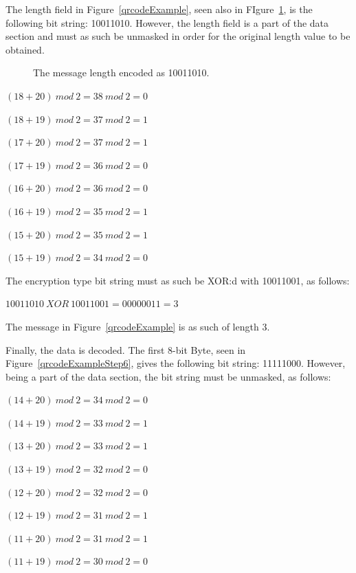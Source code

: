 The length field in Figure~\ref{qrcodeExample}, seen also in FIgure~\ref{qrcodeExampleStep5}, is the following bit string: 10011010. However, the length field is a part of the data section and must as such be unmasked in order for the original length value to be obtained.

	\begin{figure}[H]%
		\centering
		\caption{The message length encoded as 10011010.}
		\label{qrcodeExampleStep5}
	\end{figure}

\begin{center}

\((18+20)~mod~2=38~mod~2=0\)

\((18+19)~mod~2=37~mod~2=1\)

\((17+20)~mod~2=37~mod~2=1\)

\((17+19)~mod~2=36~mod~2=0\)

\((16+20)~mod~2=36~mod~2=0\) 

\((16+19)~mod~2=35~mod~2=1\)

\((15+20)~mod~2=35~mod~2=1\)

\((15+19)~mod~2=34~mod~2=0\)

\end{center}

The encryption type bit string must as such be XOR:d with 10011001, as follows:

\begin{center}
\(10011010~XOR~10011001=00000011=3\)
\end{center}

The message in Figure~\ref{qrcodeExample} is as such of length 3.

Finally, the data is decoded. The first 8-bit Byte, seen in Figure~\ref{qrcodeExampleStep6}, gives the following bit string: 11111000. However, being a part of the data section, the bit string must be unmasked, as follows:

\begin{center}

\((14+20)~mod~2=34~mod~2=0\)

\((14+19)~mod~2=33~mod~2=1\)

\((13+20)~mod~2=33~mod~2=1\)

\((13+19)~mod~2=32~mod~2=0\)

\((12+20)~mod~2=32~mod~2=0\) 

\((12+19)~mod~2=31~mod~2=1\)

\((11+20)~mod~2=31~mod~2=1\)

\((11+19)~mod~2=30~mod~2=0\)

\end{center}

